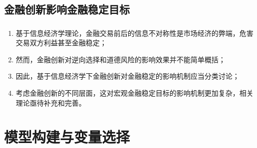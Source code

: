 \documentclass[12pt,aspectratio=169]{ctexbeamer}
\begin{document}
			\subsection{金融创新影响金融稳定目标}
			\begin{frame}[label=theo-flaws]
				\frametitle{}
				\begin{enumerate}
					\justifying
					\normalsize
					\item 基于信息经济学理论，金融交易前后的信息不对称性是市场经济的弊端，危害交易双方利益甚至金融稳定；
					\item 然而，金融创新对逆向选择和道德风险的影响效果并不能简单概括；
					\item 因此，基于信息经济学下金融创新对金融稳定的影响机制应当分类讨论；
					\item 考虑金融创新的不同层面，这对宏观金融稳定目标的影响机制更加复杂，相关理论亟待补充和完善。
					\hyperlink{pr}{\beamergotobutton{}}
				\end{enumerate}
			\end{frame}
			
			\section{模型构建与变量选择}
\end{document}
